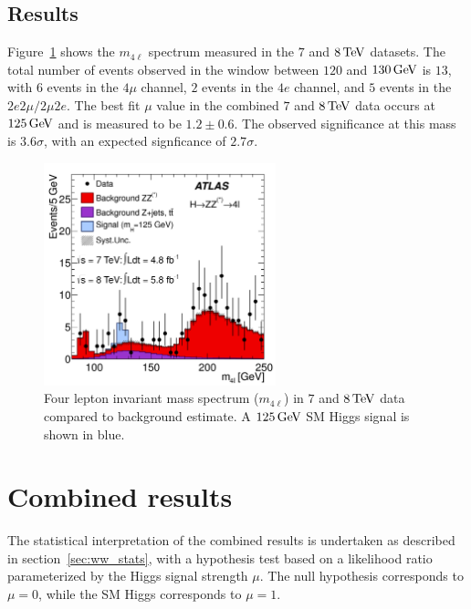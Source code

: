 \subsection{Results}

Figure~\ref{fig:disc_zz_result} shows the $m_{4\ell}$ spectrum measured in the $7$ and $8 \TeV$ datasets. The total number of events observed in the window between $120$ and $130 \GeV$ is $13$, with $6$ events in the $4\mu$ channel, $2$ events in the $4e$ channel, and $5$ events in the $2e2\mu/2\mu2e$. The best fit $\mu$ value in the combined $7$ and $8 \TeV$ data occurs at $125 \GeV$ and is measured to be $1.2 \pm 0.6$. The observed significance at this mass is $3.6\sigma$, with an expected signficance of $2.7\sigma$. 

\begin{figure}[h!]
  \centering
  \captionsetup{justification=centering}
  \includegraphics[width=0.6\textwidth]{figures/discovery_m4l}
  \caption{Four lepton invariant mass spectrum ($m_{4\ell}$) in $7$ and $8 \TeV$ data compared to background estimate. A $125 \GeV$ SM Higgs signal is shown in blue\cite{Discovery}.}
  \label{fig:disc_zz_result}
\end{figure}

\section{Combined results}

The statistical interpretation of the combined results is undertaken as described in section~\ref{sec:ww_stats}, with a hypothesis test based on a likelihood ratio parameterized by the Higgs signal strength $\mu$. The null hypothesis corresponds to $\mu = 0$, while the SM Higgs corresponds to $\mu = 1$. 

